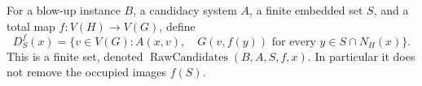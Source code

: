 \begin{definition}
For a blow-up instance $B$, a candidacy system $A$, a finite embedded
set $S$, and a total map $f:V(H)\to V(G)$, define
\[
 D_S^f(x)=\{v\in V(G):A(x,v),\quad
                  G(v,f(y))\text{ for every }y\in S\cap N_H(x)\}.
\]
This is a finite set, denoted $\operatorname{RawCandidates}(B,A,S,f,x)$.
In particular it does not remove the occupied images $f(S)$.
\end{definition}
